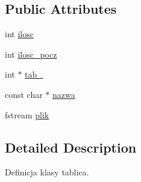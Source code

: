 \subsection*{\-Public \-Attributes}
\begin{DoxyCompactItemize}
\item 
int \hyperlink{classtablica_af78b1ba93fce972d87e7ce98ae93c8cc}{ilosc}
\item 
int \hyperlink{classtablica_a3073633c65ed1e1972d93f8634181b13}{ilosc\-\_\-pocz}
\item 
int $\ast$ \hyperlink{classtablica_a6733b3a13cea82d3e650af56c23ac976}{tab\-\_}
\item 
const char $\ast$ \hyperlink{classtablica_a8a732fa361987ccec1dfcf35f21087dd}{nazwa}
\item 
fstream \hyperlink{classtablica_adc72ca2e658dc620ee1d9a88de2349f4}{plik}
\end{DoxyCompactItemize}


\subsection{\-Detailed \-Description}
\-Definicja klasy tablica. 



